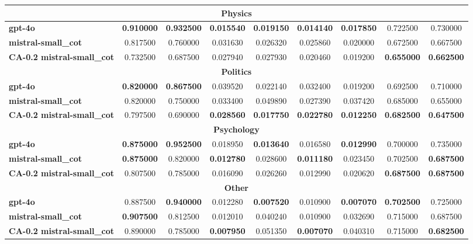 {\begin{longtable}{|l|cc|cc|cc|cc|}
\hline
\multicolumn{9}{|c|}{\textbf{Physics}} \\
\hline
\multicolumn{1}{|l|}{\textbf{gpt-4o}} & \textbf{0.910000} & \textbf{0.932500} & \textbf{0.015540} & \textbf{0.019150} & \textbf{0.014140} & \textbf{0.017850} & 0.722500 & 0.730000 \\
\multicolumn{1}{|l|}{\textbf{mistral-small\_cot}} & 0.817500 & 0.760000 & 0.031630 & 0.026320 & 0.025860 & 0.020000 & 0.672500 & 0.667500 \\
\multicolumn{1}{|l|}{\textbf{CA-0.2 mistral-small\_cot}} & 0.732500 & 0.687500 & 0.027940 & 0.027930 & 0.020460 & 0.019200 & \textbf{0.655000} & \textbf{0.662500} \\
\hline
\multicolumn{9}{|c|}{\textbf{Politics}} \\
\hline
\multicolumn{1}{|l|}{\textbf{gpt-4o}} & \textbf{0.820000} & \textbf{0.867500} & 0.039520 & 0.022140 & 0.032400 & 0.019200 & 0.692500 & 0.710000 \\
\multicolumn{1}{|l|}{\textbf{mistral-small\_cot}} & 0.820000 & 0.750000 & 0.033400 & 0.049890 & 0.027390 & 0.037420 & 0.685000 & 0.655000 \\
\multicolumn{1}{|l|}{\textbf{CA-0.2 mistral-small\_cot}} & 0.797500 & 0.690000 & \textbf{0.028560} & \textbf{0.017750} & \textbf{0.022780} & \textbf{0.012250} & \textbf{0.682500} & \textbf{0.647500} \\
\hline
\multicolumn{9}{|c|}{\textbf{Psychology}} \\
\hline
\multicolumn{1}{|l|}{\textbf{gpt-4o}} & \textbf{0.875000} & \textbf{0.952500} & 0.018950 & \textbf{0.013640} & 0.016580 & \textbf{0.012990} & 0.700000 & 0.735000 \\
\multicolumn{1}{|l|}{\textbf{mistral-small\_cot}} & \textbf{0.875000} & 0.820000 & \textbf{0.012780} & 0.028600 & \textbf{0.011180} & 0.023450 & 0.702500 & \textbf{0.687500} \\
\multicolumn{1}{|l|}{\textbf{CA-0.2 mistral-small\_cot}} & 0.807500 & 0.785000 & 0.016090 & 0.026260 & 0.012990 & 0.020620 & \textbf{0.687500} & \textbf{0.687500} \\
\hline
\multicolumn{9}{|c|}{\textbf{Other}} \\
\hline
\multicolumn{1}{|l|}{\textbf{gpt-4o}} & 0.887500 & \textbf{0.940000} & 0.012280 & \textbf{0.007520} & 0.010900 & \textbf{0.007070} & \textbf{0.702500} & 0.725000 \\
\multicolumn{1}{|l|}{\textbf{mistral-small\_cot}} & \textbf{0.907500} & 0.812500 & 0.012010 & 0.040240 & 0.010900 & 0.032690 & 0.715000 & 0.687500 \\
\multicolumn{1}{|l|}{\textbf{CA-0.2 mistral-small\_cot}} & 0.890000 & 0.785000 & \textbf{0.007950} & 0.051350 & \textbf{0.007070} & 0.040310 & 0.715000 & \textbf{0.682500} \\
\hline
\end{longtable}
}